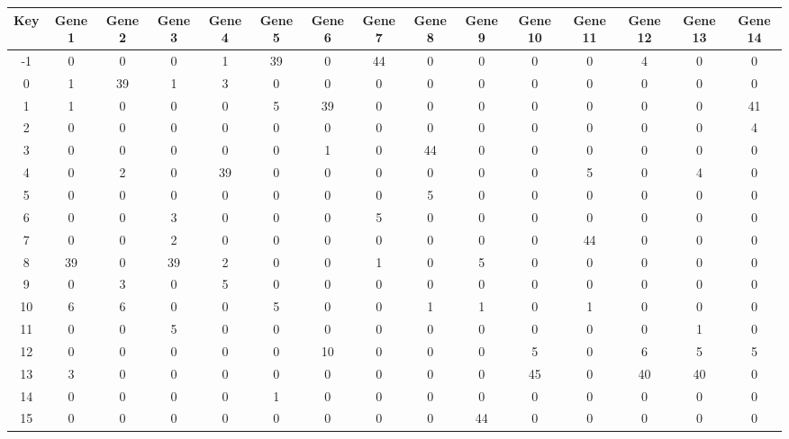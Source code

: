 \begin{tabular}{|c|c|c|c|c|c|c|c|c|c|c|c|c|c|c|}
\hline
Key & Gene 1 & Gene 2 & Gene 3 & Gene 4 & Gene 5 & Gene 6 & Gene 7 & Gene 8 & Gene 9 & Gene 10 & Gene 11 & Gene 12 & Gene 13 & Gene 14 \\
\hline
-1 & 0 & 0 & 0 & 1 & 39 & 0 & 44 & 0 & 0 & 0 & 0 & 4 & 0 & 0 \\
0 & 1 & 39 & 1 & 3 & 0 & 0 & 0 & 0 & 0 & 0 & 0 & 0 & 0 & 0 \\
1 & 1 & 0 & 0 & 0 & 5 & 39 & 0 & 0 & 0 & 0 & 0 & 0 & 0 & 41 \\
2 & 0 & 0 & 0 & 0 & 0 & 0 & 0 & 0 & 0 & 0 & 0 & 0 & 0 & 4 \\
3 & 0 & 0 & 0 & 0 & 0 & 1 & 0 & 44 & 0 & 0 & 0 & 0 & 0 & 0 \\
4 & 0 & 2 & 0 & 39 & 0 & 0 & 0 & 0 & 0 & 0 & 5 & 0 & 4 & 0 \\
5 & 0 & 0 & 0 & 0 & 0 & 0 & 0 & 5 & 0 & 0 & 0 & 0 & 0 & 0 \\
6 & 0 & 0 & 3 & 0 & 0 & 0 & 5 & 0 & 0 & 0 & 0 & 0 & 0 & 0 \\
7 & 0 & 0 & 2 & 0 & 0 & 0 & 0 & 0 & 0 & 0 & 44 & 0 & 0 & 0 \\
8 & 39 & 0 & 39 & 2 & 0 & 0 & 1 & 0 & 5 & 0 & 0 & 0 & 0 & 0 \\
9 & 0 & 3 & 0 & 5 & 0 & 0 & 0 & 0 & 0 & 0 & 0 & 0 & 0 & 0 \\
10 & 6 & 6 & 0 & 0 & 5 & 0 & 0 & 1 & 1 & 0 & 1 & 0 & 0 & 0 \\
11 & 0 & 0 & 5 & 0 & 0 & 0 & 0 & 0 & 0 & 0 & 0 & 0 & 1 & 0 \\
12 & 0 & 0 & 0 & 0 & 0 & 10 & 0 & 0 & 0 & 5 & 0 & 6 & 5 & 5 \\
13 & 3 & 0 & 0 & 0 & 0 & 0 & 0 & 0 & 0 & 45 & 0 & 40 & 40 & 0 \\
14 & 0 & 0 & 0 & 0 & 1 & 0 & 0 & 0 & 0 & 0 & 0 & 0 & 0 & 0 \\
15 & 0 & 0 & 0 & 0 & 0 & 0 & 0 & 0 & 44 & 0 & 0 & 0 & 0 & 0 \\
\hline
\end{tabular}